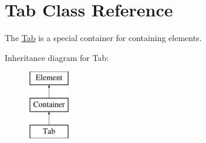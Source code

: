 \hypertarget{class_tab}{
\section{Tab Class Reference}
\label{class_tab}
}


The \hyperlink{class_tab}{Tab} is a special container for containing elements.  


Inheritance diagram for Tab:\begin{figure}[H]
\begin{center}
\leavevmode
\includegraphics[height=3.000000cm]{class_tab}
\end{center}
\end{figure}
